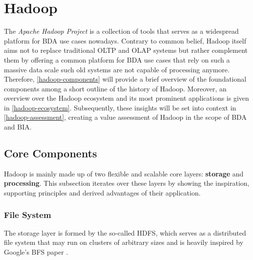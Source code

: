 \section{Hadoop}

The \emph{Apache Hadoop Project} is a collection of tools that serves as a widespread platform for \ac{BDA} use cases nowadays. Contrary to common belief, Hadoop itself aims not to replace traditional \ac{OLTP} and \ac{OLAP} systems but rather complement them by offering a common platform for \ac{BDA} use cases that rely on such a massive data scale such old systems are not capable of processing anymore. Therefore, \autoref{hadoop-components} will provide a brief overview of the foundational components among a short outline of the history of Hadoop. Moreover, an overview over the Hadoop ecosystem and its most prominent applications is given in \autoref{hadoop-ecosystem}.
Subsequently, these insights will be set into context in \autoref{hadoop-assessment}, creating a value assessment of Hadoop in the scope of \ac{BDA} and \ac{BIA}.

\subsection{Core Components}

Hadoop is mainly made up of two flexible and scalable core layers: \textbf{storage} and \textbf{processing}. This subsection iterates over these layers by showing the inspiration, supporting principles and derived advantages of their application.

\subsubsection{File System} 
The storage layer is formed by the so-called \acf{HDFS}, which serves as a distributed file system that may run on clusters of arbitrary sizes and is heavily inspired by Google's \ac{BFS} paper \autocite{ghemawat2003gfs}.

